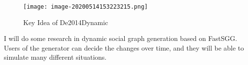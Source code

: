 \begin{survey}
\begin{figure}
  \centering
  \texttt{[image: image-20200514153223215.png]}
  \caption*{Key Idea of De2014Dynamic}
  \label{survey:Brief2}
\end{figure}

I will do some research in dynamic social graph generation based on
FastSGG. Users of the generator can decide the changes over time, and
they will be able to simulate many different situations.





\end{survey}

